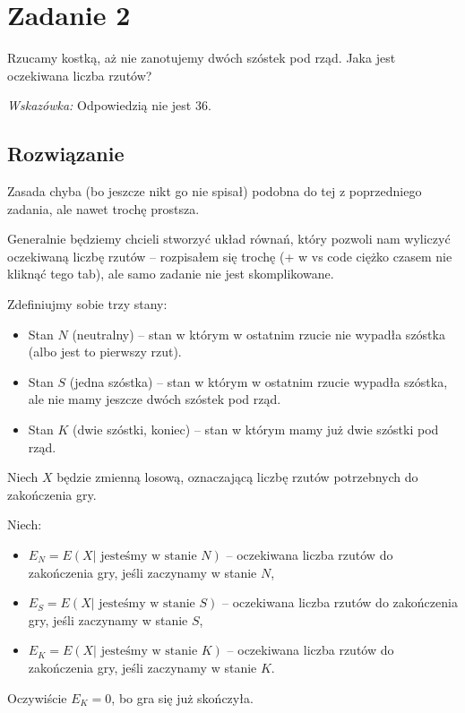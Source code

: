 \section{Zadanie 2}
Rzucamy kostką, aż nie zanotujemy dwóch szóstek pod rząd. Jaka jest oczekiwana liczba rzutów?

\textit{Wskazówka:} Odpowiedzią nie jest 36.

\subsection*{Rozwiązanie}
Zasada chyba (bo jeszcze nikt go nie spisał) podobna do tej z poprzedniego zadania,
ale nawet trochę prostsza.

Generalnie będziemy chcieli stworzyć układ równań, który pozwoli nam wyliczyć
oczekiwaną liczbę rzutów -- rozpisałem się trochę (+ w vs code ciężko czasem nie kliknąć tego tab), ale samo zadanie nie jest skomplikowane.

Zdefiniujmy sobie trzy stany:
\begin{itemize}
	\item Stan \(N\) (neutralny) -- stan w którym w ostatnim rzucie nie wypadła szóstka (albo jest to pierwszy rzut).
	\item Stan \(S\) (jedna szóstka) -- stan w którym w ostatnim rzucie wypadła szóstka, ale nie mamy jeszcze dwóch szóstek pod rząd.
	\item Stan \(K\) (dwie szóstki, koniec) -- stan w którym mamy już dwie szóstki pod rząd.
\end{itemize}

Niech \(X\) będzie zmienną losową, oznaczającą liczbę rzutów potrzebnych do zakończenia gry.

Niech:
\begin{itemize}
	\item \(E_N = E(X | \text{ jesteśmy w stanie } N)\) -- oczekiwana liczba rzutów do zakończenia gry, jeśli zaczynamy w stanie \(N\),
	\item \(E_S = E(X | \text{ jesteśmy w stanie } S)\) -- oczekiwana liczba rzutów do zakończenia gry, jeśli zaczynamy w stanie \(S\),
	\item \(E_K = E(X | \text{ jesteśmy w stanie } K)\) -- oczekiwana liczba rzutów do zakończenia gry, jeśli zaczynamy w stanie \(K\).
\end{itemize}

Oczywiście \(E_K = 0\), bo gra się już skończyła.

